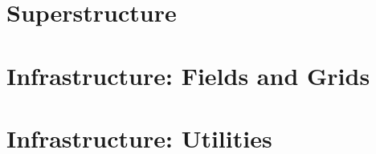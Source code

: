 \documentclass[]{article}
\begin{document}
%



\newpage
\begin{htmlonly}
\end{htmlonly}
\part{Superstructure}
\label{part:Superstructure}




\newpage
\begin{htmlonly}
\end{htmlonly}
\part{Infrastructure:  Fields and Grids}
\label{part:Infrastructure_Fields_and_Grids}



\newpage
\begin{htmlonly}
\end{htmlonly}
\part{Infrastructure:  Utilities}
\label{part:Infrastructure_Utilities}
\end{document}
